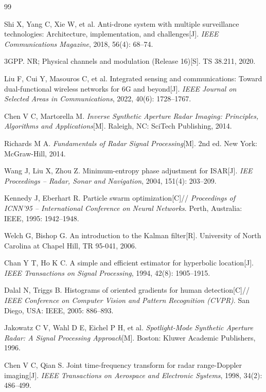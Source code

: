 \documentclass[12pt, a4paper]{article}
\begin{document}
\newpage
\begin{thebibliography}{99}

Shi X, Yang C, Xie W, et al.
Anti-drone system with multiple surveillance technologies: Architecture, implementation, and challenges[J].
\textit{IEEE Communications Magazine}, 2018, 56(4): 68--74.

3GPP.
NR; Physical channels and modulation (Release 16)[S].
TS 38.211, 2020.

Liu F, Cui Y, Masouros C, et al.
Integrated sensing and communications: Toward dual-functional wireless networks for 6G and beyond[J].
\textit{IEEE Journal on Selected Areas in Communications}, 2022, 40(6): 1728--1767.

Chen V C, Martorella M.
\textit{Inverse Synthetic Aperture Radar Imaging: Principles, Algorithms and Applications}[M].
Raleigh, NC: SciTech Publishing, 2014.

Richards M A.
\textit{Fundamentals of Radar Signal Processing}[M].
2nd ed. New York: McGraw-Hill, 2014.

Wang J, Liu X, Zhou Z.
Minimum-entropy phase adjustment for ISAR[J].
\textit{IEE Proceedings -- Radar, Sonar and Navigation}, 2004, 151(4): 203--209.

Kennedy J, Eberhart R.
Particle swarm optimization[C]//
\textit{Proceedings of ICNN'95 -- International Conference on Neural Networks}.
Perth, Australia: IEEE, 1995: 1942--1948.

Welch G, Bishop G.
An introduction to the Kalman filter[R].
University of North Carolina at Chapel Hill, TR 95-041, 2006.

Chan Y T, Ho K C.
A simple and efficient estimator for hyperbolic location[J].
\textit{IEEE Transactions on Signal Processing}, 1994, 42(8): 1905--1915.

Dalal N, Triggs B.
Histograms of oriented gradients for human detection[C]//
\textit{IEEE Conference on Computer Vision and Pattern Recognition (CVPR)}.
San Diego, USA: IEEE, 2005: 886--893.

Jakowatz C V, Wahl D E, Eichel P H, et al.
\textit{Spotlight-Mode Synthetic Aperture Radar: A Signal Processing Approach}[M].
Boston: Kluwer Academic Publishers, 1996.

Chen V C, Qian S.
Joint time-frequency transform for radar range-Doppler imaging[J].
\textit{IEEE Transactions on Aerospace and Electronic Systems}, 1998, 34(2): 486--499.


\end{thebibliography}
\end{document}
